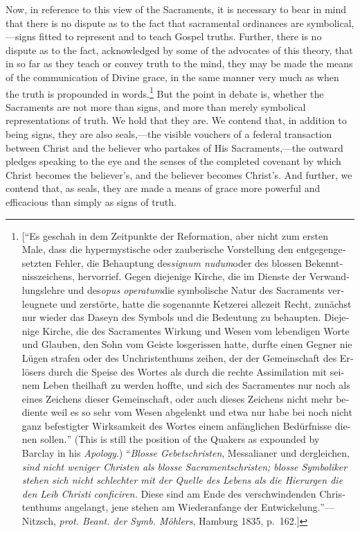 \documentclass[
  english,
]{book}
\providecommand{\textlatin}{}
\renewcommand{\textlatin}[2][]{\foreignlanguage{latin}{#2}}
\newcommand{\textgerman}[2][]{\foreignlanguage{ngerman}{#2}}
\begin{document}
Now, in reference to this view of the Sacraments, it is necessary to bear in mind that there is no dispute as to the fact that sacramental ordinances are symbolical,---signs fitted to represent and to teach Gospel truths. Further, there is no dispute as to the fact, acknowledged by some of the advocates of this theory, that in so far as they teach or convey truth to the mind, they may be made the means of the communication of Divine grace, in the same manner very much as when the truth is propounded in words.\footnote{{[}``\textgerman{Es geschah in dem Zeitpunkte der Reformation, aber nicht zum ersten Male, dass die hypermystische oder zauberische Vorstellung den entgegengesetzten Fehler, die Behauptung des}\textlatin{\emph{signum nudum}}\textgerman{oder des blossen Bekenntnisszeichens, hervorrief. Gegen diejenige Kirche, die im Dienste der Verwandlungslehre und des}\textlatin{\emph{opus operatum}}\textgerman{die symbolische Natur des Sacraments verleugnete und zerstörte, hatte die sogenannte Ketzerei allezeit Recht, zunächst nur wieder das Daseyn des Symbols und die Bedeutung zu behaupten. Diejenige Kirche, die des Sacramentes Wirkung und Wesen vom lebendigen Worte und Glauben, den Sohn vom Geiste losgerissen hatte, durfte einen Gegner nie Lügen strafen oder des Unchristenthums zeihen, der der Gemeinschaft des Erlösers durch die Speise des Wortes als durch die rechte Assimilation mit seinem Leben theilhaft zu werden hoffte, und sich des Sacramentes nur noch als eines Zeichens dieser Gemeinschaft, oder auch dieses Zeichens nicht mehr bediente weil es so sehr vom Wesen abgelenkt und etwa nur habe bei noch nicht ganz befestigter Wirksamkeit des Wortes einem anfänglichen Bedürfnisse dienen sollen.}'' (This is still the position of the Quakers as expounded by Barclay in his \emph{Apology}.) ``\textgerman{\emph{Blosse Gebetschristen}, Messalianer und dergleichen, \emph{sind nicht weniger Christen als blosse Sacramentschristen; blosse Symboliker stehen sich nicht schlechter mit der Quelle des Lebens als die Hierurgen die den Leib Christi conficiren.} Diese sind am Ende des verschwindenden Christenthums angelangt, jene stehen am Wiederanfange der Entwickelung.}''---Nitzsch, \textgerman{\emph{prot. Beant. der Symb. Möhlers}}, Hamburg 1835, p.~162.{]}} But the point in debate is, whether the Sacraments are not more than signs, and more than merely symbolical representations of truth. We hold that they are. We contend that, in addition to being signs, they are also seals,---the visible vouchers of a federal transaction between Christ and the believer who partakes of His Sacraments,---the outward pledges speaking to the eye and the senses of the completed covenant by which Christ becomes the believer's, and the believer becomes Christ's. And further, we contend that, as seals, they are made a means of grace more powerful and efficacious than simply as signs of truth.
\end{document}
